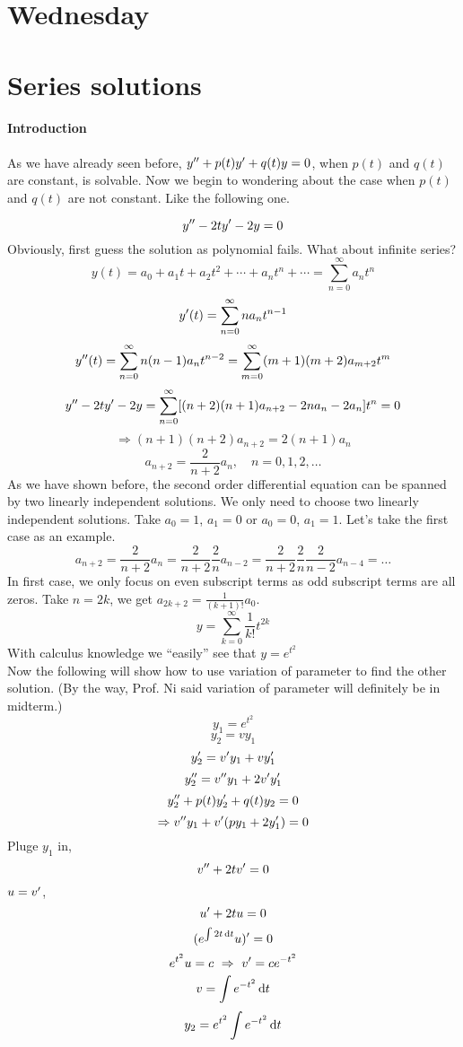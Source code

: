 

\section{Wednesday}
\section{Series solutions}
\paragraph{Introduction} As we have already seen before, $y^{\prime\prime}+p(t)y^{\prime}+q(t)y=0$, when $p(t)$ and $q(t)$ are constant, is solvable. Now we begin to wondering about the case when $p(t)$ and $q(t)$ are not constant. Like the following one.
\begin{example}
\[y^{\prime\prime}-2ty^{\prime}-2y=0
\]
Obviously, first guess the solution as polynomial fails. What about infinite series?
\[y(t)=a_0+a_1t+a_2t^2+\cdots+a_nt^n+\cdots=\sum_{n=0}^{\infty}a_nt^n
\]
\[y^{\prime}(t)=\sum_{n=0}^{\infty}na_nt^{n-1}
\]
\[y^{\prime\prime}(t)=\sum_{n=0}^{\infty}n(n-1)a_nt^{n-2}=\sum_{m=0}^{\infty}(m+1)(m+2)a_{m+2}t^m
\]
\[y^{\prime\prime}-2ty^{\prime}-2y=\sum_{n=0}^{\infty}[(n+2)(n+1)a_{n+2}-2na_n-2a_n]t^n=0
\]
\[\Rightarrow (n+1)(n+2)a_{n+2}=2(n+1)a_n
\]
\[a_{n+2}=\frac{2}{n+2}a_n,\quad n=0,1,2,\dots
\]
As we have shown before, the second order differential equation can be spanned by two linearly independent solutions. We only need to choose two linearly independent solutions. Take $a_0=1$, $a_1=0$ or $a_0=0$, $a_1=1$. Let's take the first case as an example.
\[a_{n+2}=\frac{2}{n+2}a_n=\frac{2}{n+2}\frac{2}{n}a_{n-2}=\frac{2}{n+2}\frac{2}{n}\frac{2}{n-2}a_{n-4}=\dots
\]
In first case, we only focus on even subscript terms as odd subscript terms are all zeros. Take $n=2k$, we get $a_{2k+2}=\frac{1}{(k+1)!}a_0$. 
\[y=\sum_{k=0}^\infty\frac{1}{k!}t^{2k}\]
With calculus knowledge we ``easily'' see that $y=e^{t^2}$\\
Now the following will show how to use variation of parameter to find the other solution. (By the way, Prof. Ni said variation of parameter will definitely be in midterm.)\\
\[y_1=e^{t^2}
\]
\[y_2=vy_1
\]
\[y_2^{\prime}=v^{\prime} y_1+vy_1^{\prime}
\]
\[y_2^{\prime\prime}=v^{\prime\prime} y_1+2v^{\prime} y_1^{\prime}
\]
\[y_2^{\prime\prime}+p(t)y_2^{\prime}+q(t)y_2=0
\]
\[\Rightarrow v^{\prime\prime} y_1+v^{\prime}(py_1+2y_1^{\prime})=0
\]
Pluge $y_1$ in,
\[v^{\prime\prime}+2tv^{\prime}=0
\]
$u=v^{\prime}$,
\[u^{\prime}+2tu=0
\]
\[(e^{\int2t\,\mathrm{d} t}u)^{\prime}=0
\]
\[e^{t^2}u=c~\Rightarrow~v^{\prime}=ce^{-t^2}
\]
\[v=\int e^{-t^2}\,\mathrm{d} t
\]
\[y_2=e^{t^2}\int e^{-t^2}\,\mathrm{d} t
\]
\end{example}
